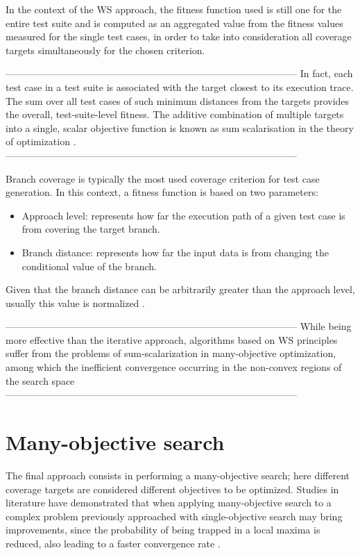 In the context of the WS approach, the fitness function used is still one for the entire test suite and is computed as an aggregated value from the fitness values measured for the single test cases, in order to take into consideration all coverage targets simultaneously for the chosen criterion.

------------------------------------------------------------------------------------------
In fact, each test case in a test suite
is associated with the target closest to its execution trace.
The sum over all test cases of such minimum distances
from the targets provides the overall, test-suite-level fitness.
The additive combination of multiple targets into a single,
scalar objective function is known as sum scalarisation in
the theory of optimization \cite{SearchMethodologies}.
------------------------------------------------------------------------------------------

Branch coverage is typically the most used coverage criterion for test case generation. In this context, a fitness function
is based on two parameters: 
\begin{itemize}
    \item Approach level: represents how far the execution path of a given test case is from covering the target branch.
    \item Branch distance: represents how far the input data is from changing the conditional value of the branch.
\end{itemize}
Given that the branch distance can be arbitrarily greater than the approach level, usually this value is normalized \cite{DBLP:conf/icst/Arcuri10}.

------------------------------------------------------------------------------------------
While being more effective than the iterative approach, algorithms based on WS principles suffer from the problems of sum-scalarization in many-objective optimization, among which the inefficient convergence occurring in the non-convex regions of the search space
------------------------------------------------------------------------------------------

\section{Many-objective search}
The final approach consists in performing a many-objective search; here different coverage targets are considered different objectives to be optimized. 
Studies in literature \cite{DBLP:conf/ppsn/HandlLK08} have demonstrated that when applying many-objective search to a complex problem previously approached with single-objective search may bring improvements, since the probability of being trapped in a local maxima is reduced, also leading to a faster convergence rate \cite{DBLP:conf/icst/PanichellaKT15}.

